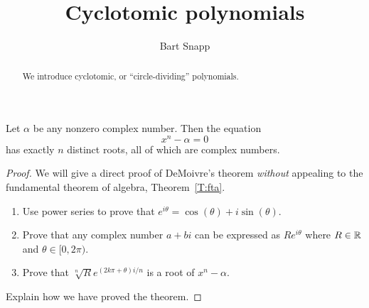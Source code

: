 \documentclass{ximera}
\author{Bart Snapp}
\title{Cyclotomic polynomials}
\begin{document}
\begin{abstract}
  We introduce cyclotomic, or ``circle-dividing'' polynomials.
\end{abstract}
\maketitle

\begin{theorem} 
Let $\alpha$ be any nonzero complex number. Then the equation
\[
x^n - \alpha = 0
\]
has exactly $n$ distinct roots, all of which are complex numbers.
\begin{proof} 
We will give a direct proof of DeMoivre's theorem \textit{without}
appealing to the fundamental theorem of algebra, Theorem~\ref{T:fta}.
\begin{enumerate}
\item Use power series to prove that $e^{i \theta} = \cos(\theta) + i
  \sin(\theta)$.
\item Prove that any complex number $a + bi$ can be expressed as $R
  e^{i\theta}$ where $R\in \mathbb R$ and $\theta \in [0,2\pi)$.
\item Prove that $\sqrt[n]{R}e^{(2k\pi +\theta)i/n}$ is a root
  of $x^n - \alpha$.
\end{enumerate}
Explain how we have proved the theorem.
\end{proof}
\end{theorem}
\end{document}
